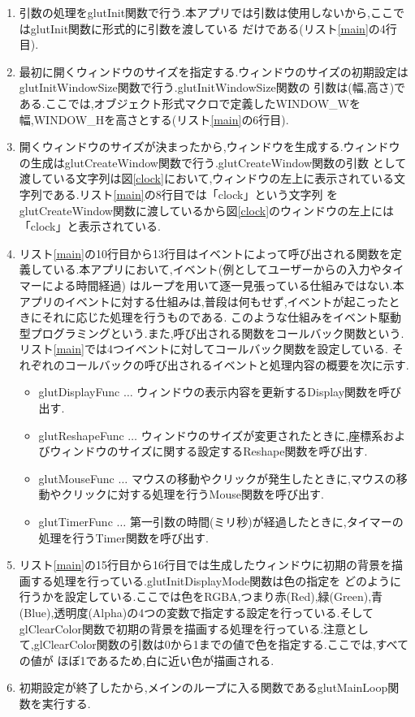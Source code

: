 \documentclass[a4j]{jarticle}
\begin{document}
  \begin{enumerate}
    \item 引数の処理をglutInit関数で行う.本アプリでは引数は使用しないから,ここではglutInit関数に形式的に引数を渡している
    だけである(リスト\ref{main}の4行目).
    \item 最初に開くウィンドウのサイズを指定する.ウィンドウのサイズの初期設定はglutInitWindowSize関数で行う.glutInitWindowSize関数の
    引数は(幅,高さ)である.ここでは,オブジェクト形式マクロで定義したWINDOW\_Wを幅,WINDOW\_Hを高さとする(リスト\ref{main}の6行目).
    \item 開くウィンドウのサイズが決まったから,ウィンドウを生成する.ウィンドウの生成はglutCreateWindow関数で行う.glutCreateWindow関数の引数
    として渡している文字列は図\ref{clock}において,ウィンドウの左上に表示されている文字列である.リスト\ref{main}の8行目では「clock」という文字列
    をglutCreateWindow関数に渡しているから図\ref{clock}のウィンドウの左上には「clock」と表示されている.
    \item リスト\ref{main}の10行目から13行目はイベントによって呼び出される関数を定義している.本アプリにおいて,イベント(例としてユーザーからの入力やタイマーによる時間経過)
    はループを用いて逐一見張っている仕組みではない.本アプリのイベントに対する仕組みは,普段は何もせず,イベントが起こったときにそれに応じた処理を行うものである.
    このような仕組みをイベント駆動型プログラミングという.また,呼び出される関数をコールバック関数という.リスト\ref{main}では4つイベントに対してコールバック関数を設定している.
    それぞれのコールバックの呼び出されるイベントと処理内容の概要を次に示す.
    \begin{itemize}
      \item glutDisplayFunc $\dots$ ウィンドウの表示内容を更新するDisplay関数を呼び出す.
      \item glutReshapeFunc $\dots$ ウィンドウのサイズが変更されたときに,座標系およびウィンドウのサイズに関する設定するReshape関数を呼び出す.
      \item glutMouseFunc $\dots$ マウスの移動やクリックが発生したときに,マウスの移動やクリックに対する処理を行うMouse関数を呼び出す.
      \item glutTimerFunc $\dots$ 第一引数の時間(ミリ秒)が経過したときに,タイマーの処理を行うTimer関数を呼び出す.
    \end{itemize}
    \item リスト\ref{main}の15行目から16行目では生成したウィンドウに初期の背景を描画する処理を行っている.glutInitDisplayMode関数は色の指定を
    どのように行うかを設定している.ここでは色をRGBA,つまり赤(Red),緑(Green),青(Blue),透明度(Alpha)の4つの変数で指定する設定を行っている.そして
    glClearColor関数で初期の背景を描画する処理を行っている.注意として,glClearColor関数の引数は0から1までの値で色を指定する.ここでは,すべての値が
    ほぼ1であるため,白に近い色が描画される.
    \item 初期設定が終了したから,メインのループに入る関数であるglutMainLoop関数を実行する.
  \end{enumerate}
\end{document}
